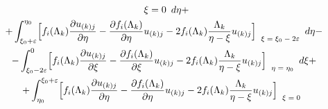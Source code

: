 \begin{multline}
{{\begin{array}{l}

\xi=0

 \end{array} }}

  d \eta +\\

+ \int _{\xi_0+ \varepsilon}^{\eta_0}

\Bigl[

f_i(\Lambda_k) \frac{\partial u_{(k)j}}{\partial \eta} - \frac{\partial f_i(\Lambda_k)}{\partial \eta} u_{(k)j} - 2 f_i(\Lambda_k) \frac{\Lambda_k}{\eta-\xi} u_{(k)j}

\Bigr]

_{\scriptsize{

\begin{array}{l}

\xi=\xi_0-2 \varepsilon

 \end{array} }}

  d \eta -\\

- \int _{\xi_0- 2\varepsilon}^{0}

\Bigl[

f_i(\Lambda_k) \frac{\partial u_{(k)j}}{\partial \xi} - \frac{\partial f_i(\Lambda_k)}{\partial \xi} u_{(k)j} - 2 f_i(\Lambda_k) \frac{\Lambda_k}{\eta-\xi} u_{(k)j}

\Bigr]

_{\scriptsize{

\begin{array}{l}

\eta=\eta_0

 \end{array} }}

  d \xi +

  \\

+ \int _{\eta_0}^{\xi_0+\varepsilon}

\Bigl[

f_i(\Lambda_k) \frac{\partial u_{(k)j}}{\partial \eta} - \frac{\partial f_i(\Lambda_k)}{\partial \eta} u_{(k)j} - 2 f_i(\Lambda_k) \frac{\Lambda_k}{\eta-\xi} u_{(k)j}

\Bigr]

_{\scriptsize{

\begin{array}{l}

\xi=0

 \end{array} }}


\end{multline}
